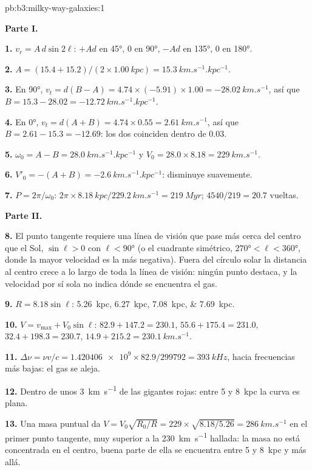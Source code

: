 \begin{solution}{pb:b3:milky-way-galaxies:1}

\textbf{Parte I.}

\textbf{1.} $v_r = A\,d\sin2\ell$: $+A d$ en \ang{45}, 0 en \ang{90}, $-A d$ en
\ang{135}, 0 en \ang{180}.

\textbf{2.} $A = (15.4 + 15.2)/(2\times\qty{1.00}{kpc}) =
\qty{15.3}{km.s^{-1}.kpc^{-1}}$.

\textbf{3.} En \ang{90}, $v_t = d(B - A) = 4.74\times(-5.91)\times1.00 =
\qty{-28.02}{km.s^{-1}}$, así que $B = 15.3 - 28.02 =
\qty{-12.72}{km.s^{-1}.kpc^{-1}}$.

\textbf{4.} En \ang{0}, $v_t = d(A + B) = 4.74\times0.55 =
\qty{2.61}{km.s^{-1}}$, así que $B = 2.61 - 15.3 = \num{-12.69}$: los dos
coinciden dentro de \num{0.03}.

\textbf{5.} $\omega_0 = A - B = \qty{28.0}{km.s^{-1}.kpc^{-1}}$ y
$V_0 = 28.0\times8.18 = \qty{229}{km.s^{-1}}$.

\textbf{6.} $V'_0 = -(A + B) = \qty{-2.6}{km.s^{-1}.kpc^{-1}}$: disminuye suavemente.

\textbf{7.} $P = 2\pi/\omega_0$: $2\pi\times\qty{8.18}{kpc}/\qty{229.2}{km.s^{-1}}
= \qty{219}{Myr}$; $4540/219 = 20.7$ vueltas.

\textbf{Parte II.}

\textbf{8.} El punto tangente requiere una línea de visión que pase más cerca del
centro que el Sol, $\sin\ell > 0$ con $\ell < \ang{90}$ (o el
cuadrante simétrico, $\ang{270} < \ell < \ang{360}$, donde la mayor
velocidad es la más negativa). Fuera del círculo solar la distancia
al centro crece a lo largo de toda la línea de visión: ningún punto destaca,
y la velocidad por sí sola no indica dónde se encuentra el gas.

\textbf{9.} $R = 8.18\sin\ell$: \qtylist{5.26;6.27;7.08;7.69}{kpc}.

\textbf{10.} $V = v_\mathrm{max} + V_0\sin\ell$: $82.9 + 147.2 = 230.1$,
$55.6 + 175.4 = 231.0$, $32.4 + 198.3 = 230.7$, $14.9 + 215.2 =
\qty{230.1}{km.s^{-1}}$.

\textbf{11.} $\Delta\nu = \nu v/c = \num{1.420406e9}\times82.9/299792 =
\qty{393}{kHz}$, hacia frecuencias más bajas: el gas se aleja.

\textbf{12.} Dentro de unos \qty{3}{km.s^{-1}} de las gigantes rojas: entre 5 y
\qty{8}{kpc} la curva es plana.

\textbf{13.} Una masa puntual da $V = V_0\sqrt{R_0/R} = 229\times\sqrt{8.18/5.26} =
\qty{286}{km.s^{-1}}$ en el primer punto tangente, muy superior a la
\qty{230}{km.s^{-1}} hallada: la masa no está concentrada en el centro,
buena parte de ella se encuentra entre 5 y \qty{8}{kpc} y más allá.


\end{solution}
